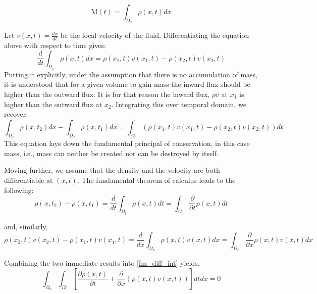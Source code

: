 \documentclass[11pt, a4paper]{report}
\begin{document}
\begin{equation*}
    \mathrm{M}(t) = \int_{\Omega_{x}}\rho(x, t)dx
\end{equation*}

Let $v(x, t) = \frac{dx}{dt}$ be the local velocity of the fluid. Differentiating the equation above with respect
to time gives:
\begin{equation*} \label{fm_diff}
    \frac{d}{dt}\int_{\Omega_{x}}\rho(x, t) dx = \rho\left(x_{1}, t\right) v\left(x_{1}, t\right) - \rho\left(x_{2}, t\right) v\left(x_{2}, t\right)
\end{equation*}
Putting it explicitly, under the assumption that there is no accumulation of mass, it is understood that for a 
given volume to gain mass the inward flux should be higher than the outward flux. It is for that reason the 
inward flux, $\rho v$ at $x_1$ is higher than the outward flux at $x_2$. Integrating this over temporal domain, 
we recover:
\begin{equation} \label{fm_diff_int}
    \int_{\Omega_{x}} \rho\left(x, t_{2}\right)dx - \int_{\Omega_{x}} \rho\left(x, t_{1}\right)dx = \int_{\Omega_{t}} (\rho\left(x_{1}, t\right) v\left(x_{1}, t\right) - \rho\left(x_{2}, t\right) v\left(x_{2}, t\right))dt 
\end{equation}
This equation lays down the fundamental principal of conservation, in this case mass, i.e., mass can neither be 
created nor can be destroyed by itself.

Moving further, we assume that the density and the velocity are both differentiable at $(x, t)$. The fundamental 
theorem of calculus leads to the following:
\begin{equation*}
    \rho\left(x, t_{2}\right) - \rho\left(x, t_{1}\right) = \frac{d}{dt}\int_{\Omega_{t}}\rho(x, t)dt = \int_{\Omega_{t}}\frac{\partial}{\partial t}\rho(x, t)dt
\end{equation*}

and, similarly,
\begin{equation*}
    \rho\left(x_{2},t\right)v\left(x_{2}, t\right) - \rho\left(x_{1}, t\right)v\left(x_{1}, t\right) = \frac{d}{dx}\int_{\Omega_{x}} \rho(x, t)v(x, t)dx = \int_{\Omega_{x}}\frac{\partial}{\partial x}\rho(x, t)v(x, t)dx
\end{equation*}

Combining the two immediate results into \eqref{fm_diff_int} yields,
\begin{equation} \label{fm_consform}
    \int_{\Omega_{x}}\int_{\Omega_{t}}\left[\frac{\partial \rho(x, t)}{\partial t} + \frac{\partial}{\partial x}(\rho(x, t) v(x, t))\right] dtdx = 0
\end{equation}
\end{document}
